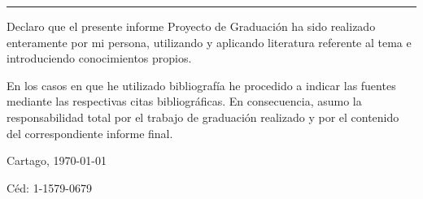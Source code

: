 \thispagestyle{empty}

\rule{10mm}{0pt}

\vfill

Declaro que el presente informe Proyecto de Graduación ha sido realizado enteramente
por mi persona, utilizando y aplicando literatura referente al tema e
introduciendo conocimientos propios.

En los casos en que he utilizado bibliografía he procedido a indicar las
fuentes mediante las respectivas citas bibliográficas.  En consecuencia,
asumo la responsabilidad total por el trabajo de graduación realizado y por
el contenido del correspondiente informe final.



\vspace*{8mm}

\begin{flushright}
  \scriptAuthor\par
  Cartago, \today\par
  Céd: 1-1579-0679
\end{flushright}

\vspace*{8mm}

\begin{center}
  \doclicenseThis
\end{center}

\cleardoublepage

